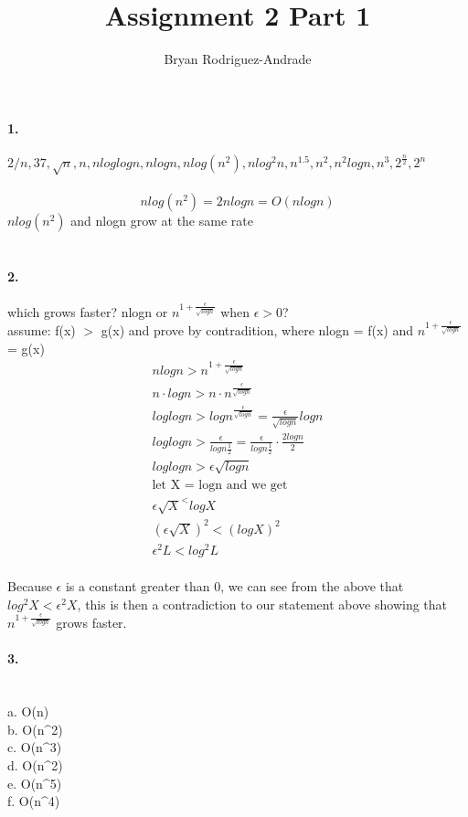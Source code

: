 \documentclass{article}
\author{Bryan Rodriguez-Andrade}
\title{Assignment 2 Part 1}
\begin{document}
\paragraph{1.}

$2/n, 37, \sqrt{n}, n, nloglogn, nlogn, nlog(n^2), nlog^2n, n^{1.5}, n^2, n^2logn, n^3, 2^{\frac{n}{2}}, 2^n$
 \\
 \\
$$nlog(n^2) = 2nlogn= O(nlogn)$$
$nlog(n^2)$ and nlogn grow at the same rate \\
 \\
\paragraph{2.} which grows faster? nlogn or $n^{1+\frac{\epsilon}{\sqrt{logn}}}$ when $\epsilon > 0$?\\
assume: f(x) $>$ g(x) and prove by contradition, where nlogn = f(x) and $n^{1+\frac{\epsilon}{\sqrt{logn}}}$ = g(x) \\

\begin{align*}
nlogn>n^{1+\frac{\epsilon}{\sqrt{logn}}}\\
n \cdot log n > n \cdot n^{\frac{\epsilon}{\sqrt{logn}}}\\
loglogn > logn^{\frac{\epsilon}{\sqrt{logn}}} = \frac{\epsilon}{\sqrt{logn}}logn\\
loglogn > \frac{\epsilon}{logn\frac{1}{2}} = \frac{\epsilon}{logn\frac{1}{2}} \cdot \frac{2logn}{2}\\
loglogn > \epsilon\sqrt{logn}\\
\text{let X = logn and we get} \\
\epsilon \sqrt{X}^ < logX\\
(\epsilon\sqrt{X})^2 < (logX)^2\\
\epsilon^2L < log^2L
\end{align*}
 \\
Because $\epsilon$ is a constant greater than 0, we can see from the above that $log^2X < \epsilon^2X$, this is then a contradiction to our statement above showing
that $n^{1+\frac{\epsilon}{\sqrt{logn}}}$ grows faster.\\

\paragraph{3.}\\
a. O(n)\\
b. O(n^2)\\
c. O(n^3)\\
d. O(n^2)\\
e. O(n^5)\\
f. O(n^4)
\end{document}
